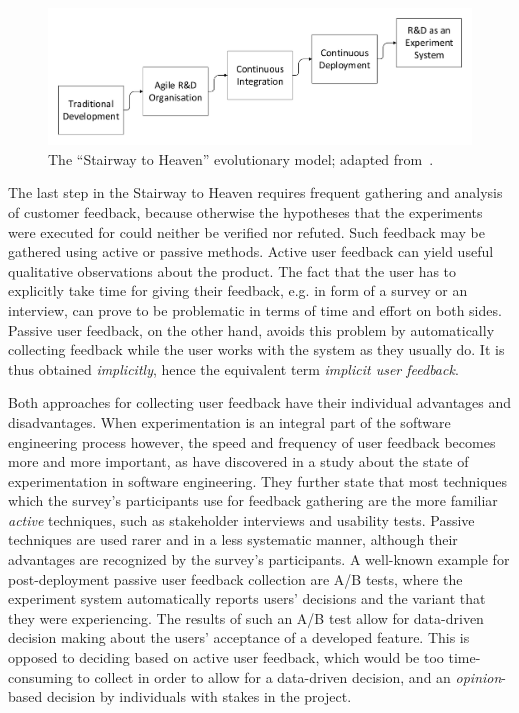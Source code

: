 \begin{figure}[ht]
        \includegraphics[width=\textwidth]{gfx/stairway.pdf}
        \caption{The ``Stairway to Heaven'' evolutionary model; adapted from~\cite{Olsson2012}.}
        \label{fig:stairway}
\end{figure}

The last step in the Stairway to Heaven requires frequent gathering and analysis of customer feedback, because otherwise the hypotheses that the experiments were executed for could neither be verified nor refuted.
Such feedback may be gathered using active or passive methods.
Active user feedback can yield useful qualitative observations about the product.
The fact that the user has to explicitly take time for giving their feedback, e.g. in form of a survey or an interview, can prove to be problematic in terms of time and effort on both sides.
Passive user feedback, on the other hand, avoids this problem by automatically collecting feedback while the user works with the system as they usually do.
It is thus obtained \emph{implicitly}, hence the equivalent term \emph{implicit user feedback}.

Both approaches for collecting user feedback have their individual advantages and disadvantages.
When experimentation is an integral part of the software engineering process however, the speed and frequency of user feedback becomes more and more important, as \citet{lindgren2015software} have discovered in a study about the state of experimentation in software engineering.
They further state that most techniques which the survey's participants use for feedback gathering are the more familiar \emph{active} techniques, such as stakeholder interviews and usability tests.
Passive techniques are used rarer and in a less systematic manner, although their advantages are recognized by the survey's participants.
A well-known example for post-deployment passive user feedback collection are A/B tests, where the experiment system automatically reports users' decisions and the variant that they were experiencing.
The results of such an A/B test allow for data-driven decision making about the users' acceptance of a developed feature.
This is opposed to deciding based on active user feedback, which would be too time-consuming to collect in order to allow for a data-driven decision, and an \emph{opinion}-based decision by individuals with stakes in the project.


